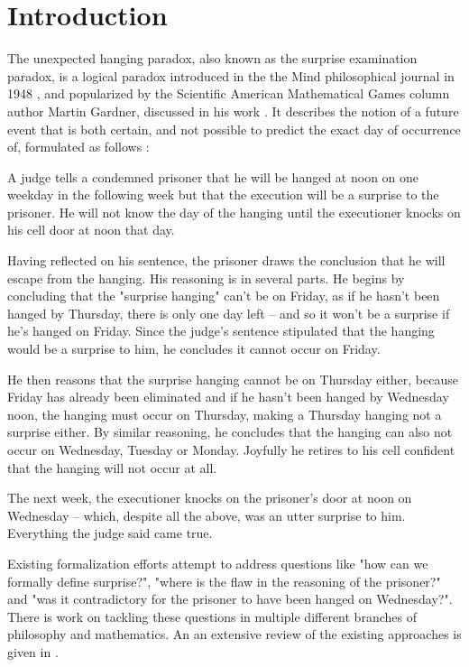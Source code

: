 \documentclass[runningheads]{llncs}
\newenvironment{myindent}{\begin{adjustwidth}{1cm}{}}{\end{adjustwidth}}
\begin{document}
\section{Introduction}

The unexpected hanging paradox, also known as the surprise examination paradox,
is a logical paradox introduced in the the Mind philosophical journal in 1948 \cite{original},
and popularized by the Scientific American Mathematical
Games column author Martin Gardner, discussed in his work \cite{diversions}.
It describes the notion of a future event that
is both certain, and not possible to predict the exact day of occurrence of,
formulated as follows :

\begin{myindent}
  A judge tells a condemned prisoner that he will be hanged at noon on one weekday
  in the following week but that the execution will be a surprise to the prisoner.
  He will not know the day of the hanging until the executioner knocks on his cell door at noon that day.

  Having reflected on his sentence, the prisoner draws the conclusion that he will
  escape from the hanging. His reasoning is in several parts. He begins by concluding
  that the "surprise hanging" can't be on Friday, as if he hasn't been hanged by
  Thursday, there is only one day left – and so it won't be a surprise if he's hanged on
  Friday. Since the judge's sentence stipulated that the hanging would be a surprise
  to him, he concludes it cannot occur on Friday.

  He then reasons that the surprise hanging cannot be on Thursday either, because
  Friday has already been eliminated and if he hasn't been hanged by Wednesday noon,
  the hanging must occur on Thursday, making a Thursday hanging not a surprise either.
  By similar reasoning, he concludes that the hanging can also not occur on Wednesday,
  Tuesday or Monday. Joyfully he retires to his cell confident that the hanging will
  not occur at all.

  The next week, the executioner knocks on the prisoner's door at noon on Wednesday –
  which, despite all the above, was an utter surprise to him. Everything the judge said came true.
\end{myindent}

Existing formalization efforts attempt to address questions like "how can we formally
define surprise?", "where is the flaw in the
reasoning of the prisoner?" and "was it contradictory for the prisoner to have been
hanged on Wednesday?". There is work on tackling these questions in multiple
different branches of philosophy and mathematics.
An an extensive review of the existing approaches is given in \cite{extensivereview}.
\end{document}
